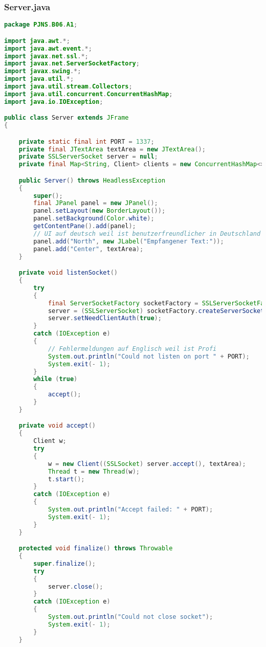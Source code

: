 \documentclass[twoside]{article}
\begin{document}
		\subsubsection*{Server.java}
		\begin{lstlisting}[language=Java]
package PJNS.B06.A1;

import java.awt.*;
import java.awt.event.*;
import javax.net.ssl.*;
import javax.net.ServerSocketFactory;
import javax.swing.*;
import java.util.*;
import java.util.stream.Collectors;
import java.util.concurrent.ConcurrentHashMap;
import java.io.IOException;

public class Server extends JFrame
{

    private static final int PORT = 1337;
    private final JTextArea textArea = new JTextArea();
    private SSLServerSocket server = null;
    private final Map<String, Client> clients = new ConcurrentHashMap<>();

    public Server() throws HeadlessException
    {
        super();
        final JPanel panel = new JPanel();
        panel.setLayout(new BorderLayout());
        panel.setBackground(Color.white);
        getContentPane().add(panel);
        // UI auf deutsch weil ist benutzerfreundlicher in Deutschland
        panel.add("North", new JLabel("Empfangener Text:"));
        panel.add("Center", textArea);
    }

    private void listenSocket()
    {
        try
        {
            final ServerSocketFactory socketFactory = SSLServerSocketFactory.getDefault();
            server = (SSLServerSocket) socketFactory.createServerSocket(PORT);
            server.setNeedClientAuth(true);
        }
        catch (IOException e)
        {
            // Fehlermeldungen auf Englisch weil ist Profi
            System.out.println("Could not listen on port " + PORT);
            System.exit(- 1);
        }
        while (true)
        {
            accept();
        }
    }

    private void accept()
    {
        Client w;
        try
        {
            w = new Client((SSLSocket) server.accept(), textArea);
            Thread t = new Thread(w);
            t.start();
        }
        catch (IOException e)
        {
            System.out.println("Accept failed: " + PORT);
            System.exit(- 1);
        }
    }

    protected void finalize() throws Throwable
    {
        super.finalize();
        try
        {
            server.close();
        }
        catch (IOException e)
        {
            System.out.println("Could not close socket");
            System.exit(- 1);
        }
    }


\end{lstlisting}
\end{document}
